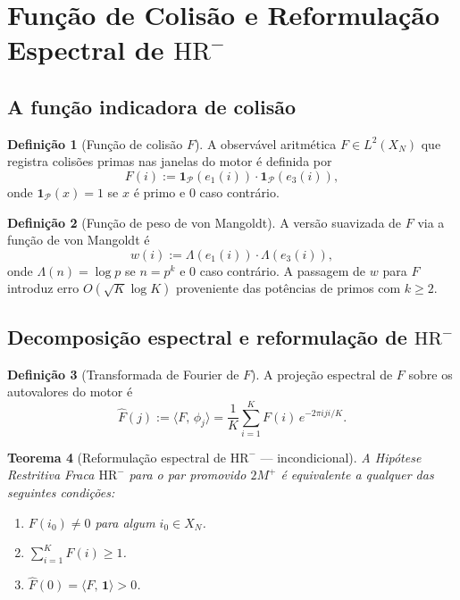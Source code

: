 \documentclass[12pt,a4paper]{article}
\newtheorem{theorem}{Teorema}[section]
\theoremstyle{definition}
\newtheorem{definition}[theorem]{Definição}
\newcommand{\PP}{\mathcal{P}}          %
\newcommand{\HRm}{\mathrm{HR}^{-}}
\newcommand{\ip}[2]{\langle #1,\, #2 \rangle}
\begin{document}
	\section{Função de Colisão e Reformulação Espectral de \texorpdfstring{$\HRm$}{HR-}}
	\label{sec:colisao}
	
	\subsection{A função indicadora de colisão}
	
	\begin{definition}[Função de colisão $F$]
		\label{def:colisao}
		A observável aritmética $F \in L^2(X_N)$ que registra colisões primas
		nas janelas do motor é definida por
		\[
		F(i) := \mathbf{1}_{\PP}(e_1(i))\cdot\mathbf{1}_{\PP}(e_3(i)),
		\]
		onde $\mathbf{1}_{\PP}(x) = 1$ se $x$ é primo e $0$ caso contrário.
	\end{definition}
	
	\begin{definition}[Função de peso de von Mangoldt]
		\label{def:mangoldt}
		A versão suavizada de $F$ via a função de von Mangoldt é
		\[
		w(i) := \Lambda(e_1(i))\cdot\Lambda(e_3(i)),
		\]
		onde $\Lambda(n) = \log p$ se $n = p^k$ e $0$ caso contrário. A
		passagem de $w$ para $F$ introduz erro $O(\sqrt{K}\log K)$ proveniente
		das potências de primos com $k \geq 2$.
	\end{definition}
	
	\subsection{Decomposição espectral e reformulação de \texorpdfstring{$\HRm$}{HR-}}
	
	\begin{definition}[Transformada de Fourier de $F$]
		A projeção espectral de $F$ sobre os autovalores do motor é
		\[
		\widehat{F}(j) := \ip{F}{\phi_j} = \frac{1}{K}\sum_{i=1}^{K}
		F(i)\,e^{-2\pi i j i/K}.
		\]
	\end{definition}
	
	\begin{theorem}[Reformulação espectral de $\HRm$ — incondicional]
		\label{thm:reformulacao}
		A Hipótese Restritiva Fraca $\HRm$ para o par promovido $2M^+$ é
		equivalente a qualquer das seguintes condições:
		\begin{enumerate}[label=(\alph*)]
			\item $F(i_0) \neq 0$ para algum $i_0 \in X_N$.
			\item $\displaystyle\sum_{i=1}^{K} F(i) \geq 1$.
			\item $\widehat{F}(0) = \ip{F}{\mathbf{1}} > 0$.
		\end{enumerate}
	\end{theorem}
	
\end{document}
